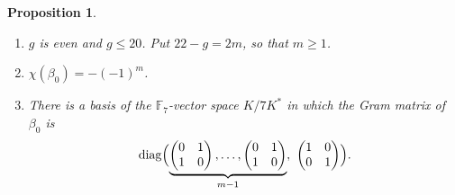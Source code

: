 \documentclass[11pt,a4paper]{article}
\newtheorem{proposition}[theorem]{Proposition}
\theoremstyle{definition}
\theoremstyle{remark}
\newcommand{\FF}{\mathbb{F}}
\begin{document}
\begin{proposition}\label{prop:disc}
\begin{enumerate}[label=\textup{(\alph*)}]
\item $g$ is even and $g\le20$. Put $22-g=2m$, so that $m\ge1$.
\item $\chi(\beta_0)=-(-1)^m$.
\item There is a basis of the $\FF_7$-vector space $K/7K^*$ in which the Gram matrix of $\beta_0$ is
\[
\mathrm{diag}\Bigl(\underbrace{\begin{pmatrix}0&1\\1&0\end{pmatrix},\dots,\begin{pmatrix}0&1\\1&0\end{pmatrix}}_{m-1},
\ \begin{pmatrix}1&0\\0&1\end{pmatrix}\Bigr).
\]
\end{enumerate}
\end{proposition}
\end{document}
